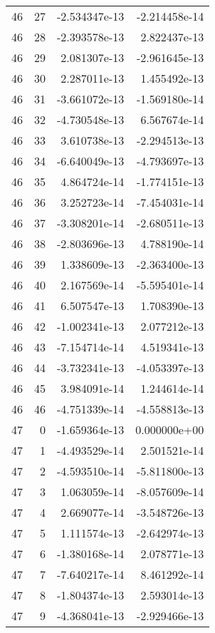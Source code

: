 \begin{tabular}{rrrr}
  46 &   27 & -2.534347e-13 & -2.214458e-14 \\
  46 &   28 & -2.393578e-13 &  2.822437e-13 \\
  46 &   29 &  2.081307e-13 & -2.961645e-13 \\
  46 &   30 &  2.287011e-13 &  1.455492e-13 \\
  46 &   31 & -3.661072e-13 & -1.569180e-14 \\
  46 &   32 & -4.730548e-13 &  6.567674e-14 \\
  46 &   33 &  3.610738e-13 & -2.294513e-13 \\
  46 &   34 & -6.640049e-13 & -4.793697e-13 \\
  46 &   35 &  4.864724e-14 & -1.774151e-13 \\
  46 &   36 &  3.252723e-14 & -7.454031e-14 \\
  46 &   37 & -3.308201e-14 & -2.680511e-13 \\
  46 &   38 & -2.803696e-13 &  4.788190e-14 \\
  46 &   39 &  1.338609e-13 & -2.363400e-13 \\
  46 &   40 &  2.167569e-14 & -5.595401e-14 \\
  46 &   41 &  6.507547e-13 &  1.708390e-13 \\
  46 &   42 & -1.002341e-13 &  2.077212e-13 \\
  46 &   43 & -7.154714e-14 &  4.519341e-13 \\
  46 &   44 & -3.732341e-13 & -4.053397e-13 \\
  46 &   45 &  3.984091e-14 &  1.244614e-14 \\
  46 &   46 & -4.751339e-14 & -4.558813e-13 \\
  47 &    0 & -1.659364e-13 &  0.000000e+00 \\
  47 &    1 & -4.493529e-14 &  2.501521e-14 \\
  47 &    2 & -4.593510e-14 & -5.811800e-13 \\
  47 &    3 &  1.063059e-14 & -8.057609e-14 \\
  47 &    4 &  2.669077e-14 & -3.548726e-13 \\
  47 &    5 &  1.111574e-13 & -2.642974e-13 \\
  47 &    6 & -1.380168e-14 &  2.078771e-13 \\
  47 &    7 & -7.640217e-14 &  8.461292e-14 \\
  47 &    8 & -1.804374e-13 &  2.593014e-13 \\
  47 &    9 & -4.368041e-13 & -2.929466e-13 \\

\end{tabular}
